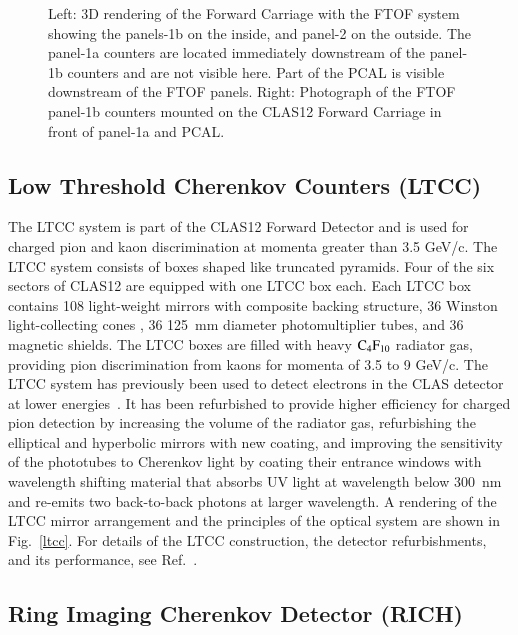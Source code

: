 \documentclass[final,3p,times,twocolumn,authoryear]{elsarticle}
\begin{document}
\begin{figure}[htbp!]
\caption{Left: 3D rendering of the Forward Carriage with the FTOF system showing the panels-1b on the inside, and panel-2 on the outside. 
The panel-1a counters are located immediately downstream of the panel-1b counters and are not visible here. Part of the PCAL is 
visible downstream of the FTOF panels. 
Right: Photograph of the FTOF panel-1b counters mounted on the CLAS12 Forward Carriage in front of panel-1a and PCAL.} 
\label{ftof-1b}
\end{figure}



\subsection{\rm Low Threshold Cherenkov Counters (LTCC)}

The LTCC system is part of the CLAS12  Forward Detector and is used for charged pion and kaon discrimination 
at momenta greater than 3.5 GeV/c. The LTCC system consists of boxes shaped like truncated pyramids. Four 
of the six sectors of CLAS12 are equipped with one LTCC box each. Each LTCC box contains 108 light-weight 
mirrors with composite backing structure, 36 Winston light-collecting cones , 36 125~mm diameter photomultiplier tubes, and 36 
magnetic shields. The LTCC boxes are filled with heavy $\rm C_4F_{10}$ radiator gas, providing pion discrimination 
from kaons for momenta of 3.5 to 9 GeV/c.  The LTCC system has previously been used to detect electrons in the CLAS detector at lower 
energies~\cite{Adams:2001kk}. It has been refurbished to provide higher efficiency for charged pion detection by increasing the volume of 
the radiator gas, refurbishing the elliptical and hyperbolic mirrors with new coating, and improving the sensitivity of the phototubes to 
Cherenkov light by coating their entrance windows with wavelength shifting material that absorbs UV light at wavelength 
below 300~nm and re-emits two back-to-back photons at larger wavelength. A rendering of the LTCC mirror arrangement and the principles of the optical system are shown in Fig.~\ref{ltcc}.  For details of the LTCC construction, the detector refurbishments, and its performance, see Ref.~\cite{LTCC}.   

\subsection{\rm Ring Imaging Cherenkov Detector (RICH)} 
\end{document}

